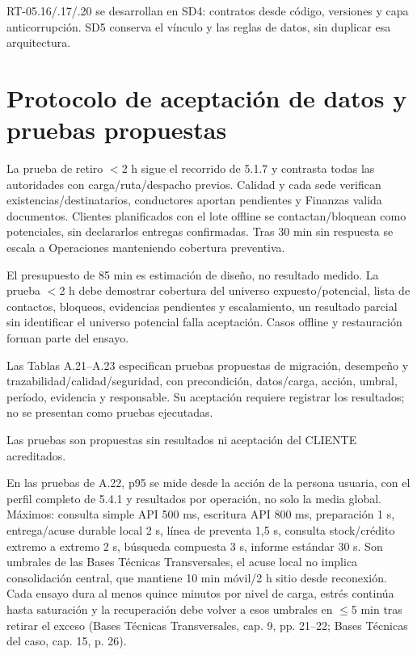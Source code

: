 
RT-05.16/.17/.20 se desarrollan en SD4: contratos desde código, versiones y capa anticorrupción. SD5 conserva el vínculo y las reglas de datos, sin duplicar esa arquitectura.

\section{Protocolo de aceptación de datos y pruebas propuestas}
\label{anexo-5j}

La prueba de retiro \ensuremath{<}2 h sigue el recorrido de 5.1.7 y contrasta todas las autoridades con carga/ruta/despacho previos. Calidad y cada sede verifican existencias/destinatarios, conductores aportan pendientes y Finanzas valida documentos. Clientes planificados con el lote offline se contactan/bloquean como potenciales, sin declararlos entregas confirmadas. Tras 30 min sin respuesta se escala a Operaciones manteniendo cobertura preventiva.

El presupuesto de 85 min es estimación de diseño, no resultado medido. La prueba \ensuremath{<}2 h debe demostrar cobertura del universo expuesto/potencial, lista de contactos, bloqueos, evidencias pendientes y escalamiento, un resultado parcial sin identificar el universo potencial falla aceptación. Casos offline y restauración forman parte del ensayo.

Las Tablas A.21–A.23 especifican pruebas propuestas de migración, desempeño y trazabilidad/calidad/seguridad, con precondición, datos/carga, acción, umbral, período, evidencia y responsable. Su aceptación requiere registrar los resultados; no se presentan como pruebas ejecutadas.

Las pruebas son propuestas sin resultados ni aceptación del CLIENTE acreditados.


En las pruebas de A.22, p95 se mide desde la acción de la persona usuaria, con el perfil completo de 5.4.1 y resultados por operación, no solo la media global. Máximos: consulta simple API 500 ms, escritura API 800 ms, preparación 1 s, entrega/acuse durable local 2 s, línea de preventa 1,5 s, consulta stock/crédito extremo a extremo 2 s, búsqueda compuesta 3 s, informe estándar 30 s. Son umbrales de las Bases Técnicas Transversales, el acuse local no implica consolidación central, que mantiene 10 min móvil/2 h sitio desde reconexión. Cada ensayo dura al menos quince minutos por nivel de carga, estrés continúa hasta saturación y la recuperación debe volver a esos umbrales en \ensuremath{\leq}5 min tras retirar el exceso (Bases Técnicas Transversales, cap. 9, pp. 21–22; Bases Técnicas del caso, cap. 15, p. 26).

